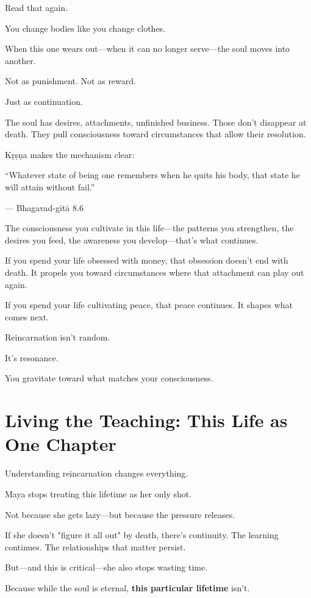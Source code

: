 \documentclass[11pt,twoside]{book}
\begin{document}
Read that again.

You change bodies like you change clothes.

When this one wears out—when it can no longer serve—the soul moves into another.

Not as punishment. Not as reward.

Just as continuation.

The soul has desires, attachments, unfinished business. Those don't disappear at death. They pull consciousness toward circumstances that allow their resolution.

Kṛṣṇa makes the mechanism clear:

\begin{pullquote}
``Whatever state of being one remembers when he quits his body, that state he will attain without fail.''

--- Bhagavad-gītā 8.6
\end{pullquote}

The consciousness you cultivate in this life—the patterns you strengthen, the desires you feed, the awareness you develop—that's what continues.

If you spend your life obsessed with money, that obsession doesn't end with death. It propels you toward circumstances where that attachment can play out again.

If you spend your life cultivating peace, that peace continues. It shapes what comes next.

Reincarnation isn't random.

It's resonance.

You gravitate toward what matches your consciousness.

\section*{Living the Teaching: This Life as One Chapter}

Understanding reincarnation changes everything.

Maya stops treating this lifetime as her only shot.

Not because she gets lazy—but because the pressure releases.

If she doesn't "figure it all out" by death, there's continuity. The learning continues. The relationships that matter persist.

But—and this is critical—she also stops wasting time.

Because while the soul is eternal, \textbf{this particular lifetime} isn't.
\end{document}
